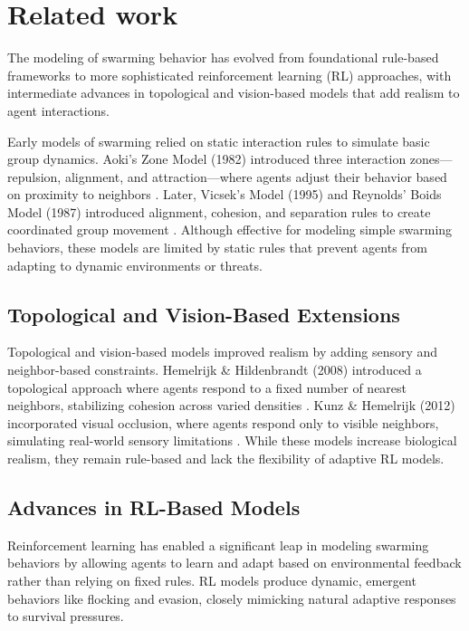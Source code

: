 \documentclass[9pt]{pnas-new}
\begin{document}
\section*{Related work}
The modeling of swarming behavior has evolved from foundational rule-based 
frameworks to more sophisticated reinforcement learning (RL) approaches, 
with intermediate advances in topological and vision-based models that 
add realism to agent interactions.

Early models of swarming relied on static interaction rules to 
simulate basic group dynamics. Aoki's Zone Model (1982) introduced 
three interaction zones—repulsion, alignment, and attraction—where agents 
adjust their behavior based on proximity to neighbors \cite{aoki1982simulation}. Later, Vicsek's Model (1995) and Reynolds’ Boids Model (1987) introduced alignment, cohesion, and separation rules to create coordinated group movement \cite{reynolds1987flocks}. Although effective for modeling simple swarming behaviors, these models are limited by static rules that prevent agents from adapting to dynamic environments or threats.

\subsection{Topological and Vision-Based Extensions}

Topological and vision-based models improved realism by adding sensory and neighbor-based constraints. Hemelrijk \& Hildenbrandt (2008) introduced a topological approach where agents respond to a fixed number of nearest neighbors, stabilizing cohesion across varied densities \cite{}. Kunz \& Hemelrijk (2012) incorporated visual occlusion, where agents respond only to visible neighbors, simulating real-world sensory limitations \cite{}. While these models increase biological realism, they remain rule-based and lack the flexibility of adaptive RL models.

\subsection{Advances in RL-Based Models}

Reinforcement learning has enabled a significant leap in modeling swarming behaviors by allowing agents to learn and adapt based on environmental feedback rather than relying on fixed rules. RL models produce dynamic, emergent behaviors like flocking and evasion, closely mimicking natural adaptive responses to survival pressures.
\end{document}
